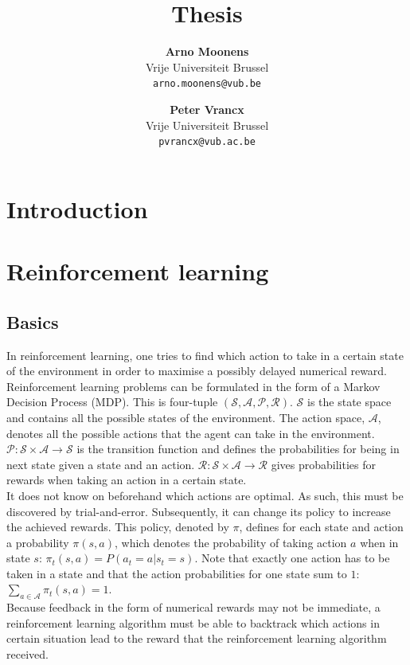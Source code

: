 \documentclass[a4paper]{article}
\title{Thesis}
\author{
	\textbf{Arno Moonens}\\
    Vrije Universiteit Brussel\\
    \texttt{arno.moonens@vub.be}\\
\and
	\textbf{Peter Vrancx}\\
    Vrije Universiteit Brussel\\
    \texttt{pvrancx@vub.ac.be}\\
}
\providecommand{\keywords}[1]{\textbf{\textit{Index terms---}} #1}
\begin{document}
\maketitle


\tableofcontents
\section{Introduction}
\section{Reinforcement learning}
\subsection{Basics}
In reinforcement learning, one tries to find which action to take in a certain state of the environment in order to maximise a possibly delayed numerical reward.\\
Reinforcement learning problems can be formulated in the form of a Markov Decision Process (MDP). This is four-tuple $(\mathcal{S}, \mathcal{A}, \mathcal{P}, \mathcal{R})$. $\mathcal{S}$ is the state space and contains all the possible states of the environment. The action space, $\mathcal{A}$, denotes all the possible actions that the agent can take in the environment. $\mathcal{P}: \mathcal{S} \times \mathcal{A} \to \mathcal{S}$ is the transition function and defines the probabilities for being in next state given a state and an action. $\mathcal{R}: \mathcal{S} \times \mathcal{A} \to \mathcal{R}$ gives probabilities for rewards when taking an action in a certain state.\\
It does not know on beforehand which actions are optimal. As such, this must be discovered by trial-and-error. Subsequently, it can change its policy to increase the achieved rewards. This policy, denoted by $\pi$, defines for each state and action a probability $\pi(s,a)$, which denotes the probability of taking action $a$ when in state $s$: $\pi_t(s,a) = P(a_t = a | s_t = s)$. Note that exactly one action has to be taken in a state and that the action probabilities for one state sum to $1$: $\sum_{a\in \mathcal{A}}\pi_t(s,a)=1$.\\
Because feedback in the form of numerical rewards may not be immediate, a reinforcement learning algorithm must be able to backtrack which actions in certain situation lead to the reward that the reinforcement learning algorithm received.\\
\end{document}
